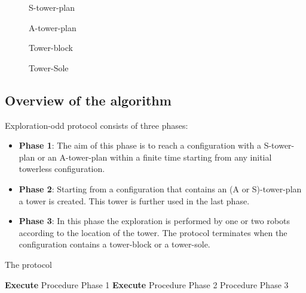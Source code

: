 \documentclass[12pt]{llncs}
\begin{document}
\begin{figure}
 \begin{minipage}[b]{.46\linewidth}
  \centering{}
  \caption{S-tower-plan\label{STP}}
 \end{minipage} \hfill
 \begin{minipage}[b]{.46\linewidth}
  \centering{}
  \caption{A-tower-plan  \label{ATP}}
 \end{minipage}
\begin{minipage}[b]{.46\linewidth}
  \centering{}
  \caption{Tower-block\label{TB}}
 \end{minipage} \hfill
 \begin{minipage}[b]{.46\linewidth}
  \centering{}
  \caption{Tower-Sole  \label{TS}}
 \end{minipage}
\end{figure}  

\subsection{\textbf{Overview of the algorithm}}
Exploration-odd protocol consists of three phases:
\begin{itemize}
\item{\textbf{Phase 1}}: The aim of this phase is to reach a configuration with a S-tower-plan or an A-tower-plan within a finite time starting from any initial towerless configuration.\\

\item{\textbf{Phase 2}}: Starting from a configuration that contains an (A or S)-tower-plan a tower is created. This tower is further used in the last phase.\\

\item{\textbf{Phase 3}}: In this phase the exploration is performed by one or two robots according to the location of the tower. The protocol terminates when the configuration contains a tower-block or a tower-sole. \\

\end{itemize}

\begin{algorithm}[H]
 \caption{The protocol}
  \label{GenAlgo.algo}
 \begin{algorithmic}[1]

         \State \textbf{Execute} Procedure Phase 1
     \Else
         \State  \textbf{Execute} Procedure Phase 2
      \Else 
            Procedure Phase 3
      \EndIf
\EndIf
\EndIf
\end{algorithmic}
\end{algorithm}
\end{document}
